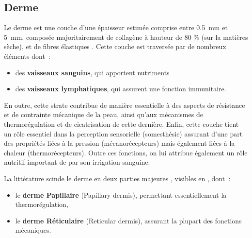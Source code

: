 \subsection{Derme}
Le derme est une couche d’une épaisseur estimée comprise entre \SI{0,5}{\milli\metre} et \SI{5}{\milli\metre}, composée majoritairement de collagène à hauteur de 80 \% (sur la matières sèche), et de fibres élastiques \cite{McGrath2010}. Cette couche est traversée par de nombreux éléments dont~: 

\begin{itemize}
    \item des \textbf{vaisseaux sanguins}, qui apportent nutriments
    \item des \textbf{vaisseaux lymphatiques}, qui assurent une fonction immunitaire.
\end{itemize}\par

En outre, cette strate contribue de manière essentielle à des aspects de résistance et de contrainte mécanique de la peau, ainsi qu’aux mécanismes de thermorégulation et de cicatrisation de cette dernière. Enfin, cette couche tient un rôle essentiel dans la perception sensorielle (somesthésie) assurant d’une part des propriétés liées à la pression (mécanorécepteurs) mais également liées à la chaleur (thermorécepteurs). Outre ces fonctions, on lui attribue également un rôle nutritif important de par son irrigation sanguine.\par

La littérature scinde le derme en deux parties majeures , visibles en , dont~:
\begin{itemize}
    \item le \textbf{derme Papillaire} (Papillary dermis), permettant essentiellement la thermorégulation,
    \item le \textbf{derme Réticulaire} (Reticular dermis), assurant la plupart des fonctions mécaniques.
\end{itemize}\par

